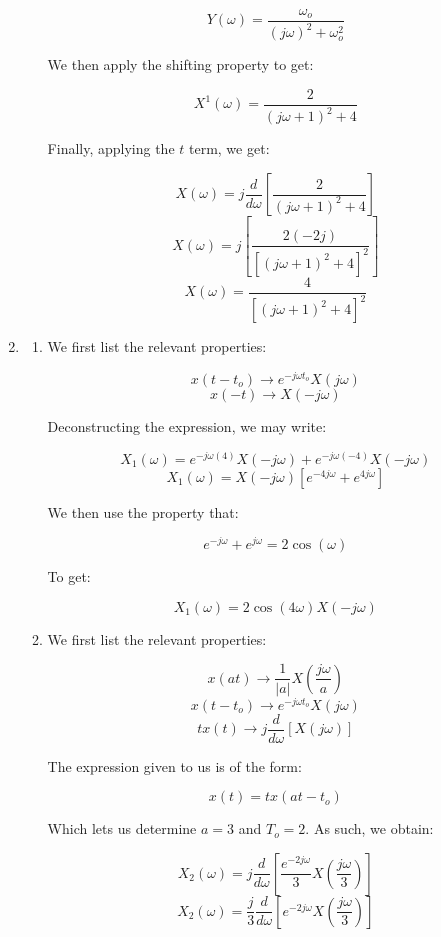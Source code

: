 \begin{enumerate}
\begin{enumerate}
        $$Y(\omega)=\frac{\omega_o}{(j\omega)^2+\omega_o^2}$$

        We then apply the shifting property to get:

        $$X^1(\omega)=\frac{2}{(j\omega+1)^2+4}$$

        Finally, applying the $t$ term, we get:

        $$X(\omega)=j\frac{d}{d\omega}\left[ \frac{2}{(j\omega+1)^2+4} \right]$$
        $$X(\omega)=j\left[ \frac{2(-2j)}{[(j\omega+1)^2+4]^2} \right]$$
        $$\boxed{X(\omega)=\frac{4}{[(j\omega+1)^2+4]^2}}$$

    \end{enumerate}

  \item

    \begin{enumerate}

      \item We first list the relevant properties:

        $$x(t-t_o)\to e^{-j\omega t_o}X(j\omega)$$
        $$x(-t)\to X(-j\omega)$$

        Deconstructing the expression, we may write:

        $$X_1(\omega)=e^{-j\omega(4)}X(-j\omega)+e^{-j\omega(-4)}X(-j\omega)$$
        $$X_1(\omega)=X(-j\omega)[e^{-4j\omega}+e^{4j\omega}]$$

        We then use the property that:

        $$e^{-j\omega}+e^{j\omega}=2\cos(\omega)$$

        To get:

        $$\boxed{X_1(\omega)=2\cos(4\omega)X(-j\omega)}$$

      \item We first list the relevant properties:

        $$x(at)\to \frac{1}{|a|}X\left( \frac{j\omega}{a} \right)$$
        $$x(t-t_o)\to e^{-j\omega t_o}X(j\omega)$$
        $$tx(t)\to j\frac{d}{d\omega}[X(j\omega)]$$

        The expression given to us is of the form:

        $$x(t)=tx(at-t_o)$$

        Which lets us determine $a=3$ and $T_o=2$. As such, we obtain:

        $$X_2(\omega)=j\frac{d}{d\omega}\left[ \frac{e^{-2j\omega}}{3}X\left(\frac{j\omega}{3}\right) \right]$$
        $$\boxed{X_2(\omega)=\frac{j}{3}\frac{d}{d\omega}\left[ e^{-2j\omega}X\left(\frac{j\omega}{3}\right) \right]}$$


\end{enumerate}
\end{enumerate}
